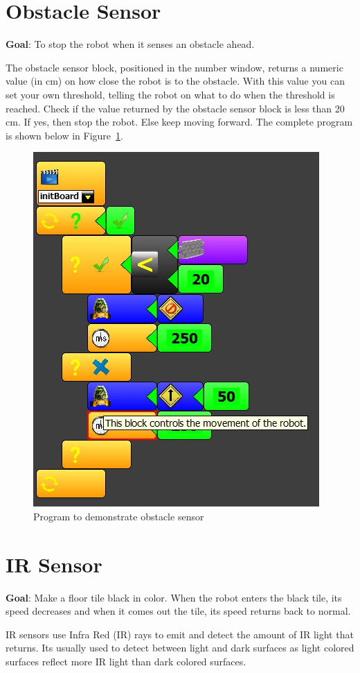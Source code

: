 \section{Obstacle Sensor}

\textbf{Goal}: To stop the robot when it senses an obstacle ahead.

The obstacle sensor block, positioned in the number window, returns a numeric value (in cm) on how close the robot is to the obstacle. With this value you can set your own threshold, telling the robot on what to do when the threshold is reached. Check if the value returned by the obstacle sensor block is less than 20 cm. If yes, then stop the robot. Else keep moving forward. The complete program is shown below in Figure~\ref{fig:lesson_8}.

\begin{figure}[h]
\centering
\includegraphics[width=0.6\columnwidth]{Images/Manual/lesson_8}
\caption{Program to demonstrate obstacle sensor}
\label{fig:lesson_8}
\end{figure}

\section{IR Sensor}

\textbf{Goal}: Make a floor tile black in color. When the robot enters the black tile, its speed decreases and when it comes out the tile, its speed returns back to normal.

IR sensors use Infra Red (IR) rays to emit and detect the amount of IR light that returns. Its usually used to detect between light and dark surfaces as light colored surfaces reflect more IR light than dark colored surfaces.

